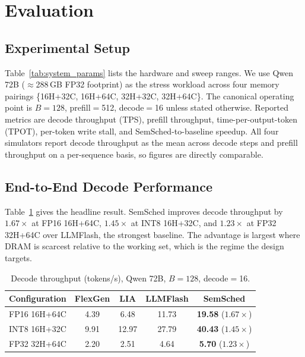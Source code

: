 \documentclass[10pt,conference,letterpaper]{IEEEtran}
\begin{document}
\section{Evaluation}
\label{sec:evaluation}

\subsection{Experimental Setup}
\noindent
Table~\ref{tab:system_params} lists the hardware and sweep ranges. We use Qwen 72B ($\approx$288\,GB FP32 footprint) as the stress workload across four memory pairings \{16H+32C, 16H+64C, 32H+32C, 32H+64C\}. The canonical operating point is $B{=}128$, prefill$=$512, decode$=$16 unless stated otherwise. Reported metrics are decode throughput (TPS), prefill throughput, time-per-output-token (TPOT), per-token write stall, and SemSched-to-baseline speedup. All four simulators report decode throughput as the mean across decode steps and prefill throughput on a per-sequence basis, so figures are directly comparable.

\subsection{End-to-End Decode Performance}
\noindent
Table~\ref{tab:headline} gives the headline result. SemSched improves decode throughput by $1.67\times$ at FP16 16H+64C, $1.45\times$ at INT8 16H+32C, and $1.23\times$ at FP32 32H+64C over LLMFlash, the strongest baseline. The advantage is largest where DRAM is scarcest relative to the working set, which is the regime the design targets.

\begin{table}[t]
\scriptsize
\centering
\caption{Decode throughput (tokens/s), Qwen 72B, $B{=}128$, decode$=$16.}
\label{tab:headline}
\begin{tabular}{@{}lcccc@{}}
\toprule
\textbf{Configuration} & \textbf{FlexGen} & \textbf{LIA} & \textbf{LLMFlash} & \textbf{SemSched} \\
\midrule
FP16 16H+64C & 4.39 & 6.48 & 11.73 & \textbf{19.58} ($1.67\times$) \\
INT8 16H+32C & 9.91 & 12.97 & 27.79 & \textbf{40.43} ($1.45\times$) \\
FP32 32H+64C & 2.20 & 2.51 & 4.64 & \textbf{5.70} ($1.23\times$) \\
\bottomrule
\end{tabular}
\vspace{1mm}
\end{table}
\end{document}
